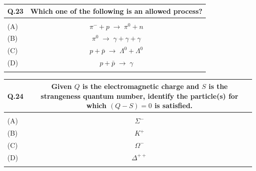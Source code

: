 \documentclass[12pt,a4paper]{article}
\begin{document}
\vspace{0.5cm}

\begin{table}[h!]
\begin{tabular}{|L|C|}
\hline
Q.23 & Which one of the following is an allowed process? \\
\hline
 & \\
\hline
(A) & $\pi^- + p \;\to\; \pi^0 + n$ \\
\hline
(B) & $\pi^0 \;\to\; \gamma + \gamma + \gamma$ \\
\hline
(C) & $p + \bar{p} \;\to\; \Lambda^0 + \Lambda^0$ \\
\hline
(D) & $p + \bar{p} \;\to\; \gamma$ \\
\hline
 & \\
\hline
\end{tabular}
\end{table}

\newpage

\begin{table}[h!]
\begin{tabular}{|L|C|}
\hline
Q.24 &
Given $Q$ is the electromagnetic charge and $S$ is the strangeness quantum number,
identify the particle(s) for which $(Q - S) = 0$ is satisfied. \\
\hline
 & \\
\hline
(A) & $\Sigma^{-}$ \\
\hline
(B) & $K^{+}$ \\
\hline
(C) & $\Omega^{-}$ \\
\hline
(D) & $\Delta^{++}$ \\
\hline
 & \\
\hline
\end{tabular}
\end{table}

\vspace{0.8cm}

\newpage
\end{document}

